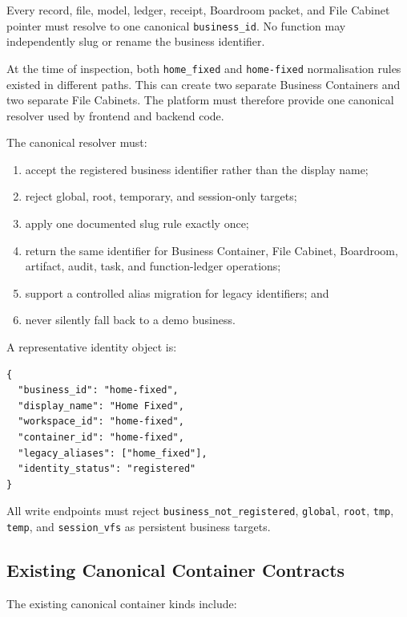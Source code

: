 Every record, file, model, ledger, receipt, Boardroom packet, and File Cabinet
pointer must resolve to one canonical \texttt{business\_id}. No function may
independently slug or rename the business identifier.

At the time of inspection, both \texttt{home\_fixed} and \texttt{home-fixed}
normalisation rules existed in different paths. This can create two separate
Business Containers and two separate File Cabinets. The platform must therefore
provide one canonical resolver used by frontend and backend code.

The canonical resolver must:

\begin{enumerate}
  \item accept the registered business identifier rather than the display name;
  \item reject global, root, temporary, and session-only targets;
  \item apply one documented slug rule exactly once;
  \item return the same identifier for Business Container, File Cabinet,
  Boardroom, artifact, audit, task, and function-ledger operations;
  \item support a controlled alias migration for legacy identifiers; and
  \item never silently fall back to a demo business.
\end{enumerate}

A representative identity object is:

\begin{verbatim}
{
  "business_id": "home-fixed",
  "display_name": "Home Fixed",
  "workspace_id": "home-fixed",
  "container_id": "home-fixed",
  "legacy_aliases": ["home_fixed"],
  "identity_status": "registered"
}
\end{verbatim}

All write endpoints must reject \texttt{business\_not\_registered},
\texttt{global}, \texttt{root}, \texttt{tmp}, \texttt{temp}, and
\texttt{session\_vfs} as persistent business targets.

\subsection{Existing Canonical Container Contracts}

The existing canonical container kinds include:

